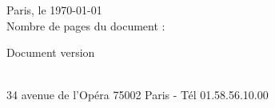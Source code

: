\pagestyle{fancy}
\thispagestyle{empty}

\begin{spacing}{1.5}
    \center
    {\fontsize{16}{18}\selectfont {}}
\end{spacing}

\vspace{1 cm}
\noindent\begin{minipage}[t]{6cm}
\end{minipage}
\hfill
\begin{minipage}[t]{5.4cm}
    \begin{flushleft}
        \begin{spacing}{1.8}
            Paris, le \today\\
            Nombre de pages du document : \pageref{LastPage}
        \end{spacing}
    \end{flushleft}
\end{minipage}

\vspace{1cm}

\begin{flushright}
    {\Huge \title\\}
    \hrulefill \\ \vspace{0.5 cm}
    {\LARGE \subtitle}
\end{flushright}
\vspace{1.5 cm}

\begin{center}
    \vspace{0.5 cm}

    \vspace{4.5cm}

    \begin{small}
        Document version \version{}
    \end{small} \\
    {\scriptsize 34 avenue de l'Opéra 75002 Paris - Tél 01.58.56.10.00}
\end{center}

\newpage
